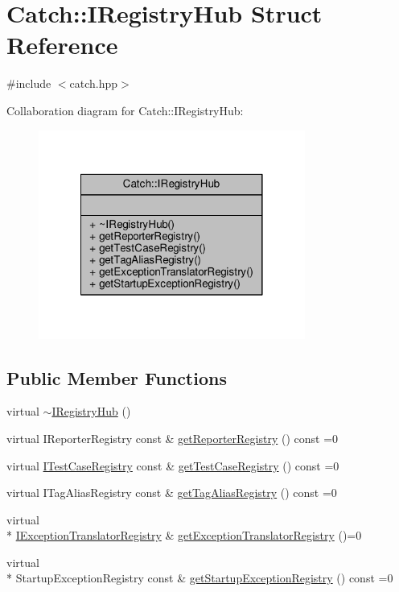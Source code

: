 \hypertarget{struct_catch_1_1_i_registry_hub}{\section{Catch\-:\-:I\-Registry\-Hub Struct Reference}
\label{struct_catch_1_1_i_registry_hub}
}


{\ttfamily \#include $<$catch.\-hpp$>$}



Collaboration diagram for Catch\-:\-:I\-Registry\-Hub\-:
\nopagebreak
\begin{figure}[H]
\begin{center}
\leavevmode
\includegraphics[width=248pt]{struct_catch_1_1_i_registry_hub__coll__graph}
\end{center}
\end{figure}
\subsection*{Public Member Functions}
\begin{DoxyCompactItemize}
\item 
virtual \hyperlink{struct_catch_1_1_i_registry_hub_a050de0f27f96888c8b410992146c9a09}{$\sim$\-I\-Registry\-Hub} ()
\item 
virtual I\-Reporter\-Registry const \& \hyperlink{struct_catch_1_1_i_registry_hub_a55534563f7ecf7e20ec1e37285ebe54d}{get\-Reporter\-Registry} () const =0
\item 
virtual \hyperlink{struct_catch_1_1_i_test_case_registry}{I\-Test\-Case\-Registry} const \& \hyperlink{struct_catch_1_1_i_registry_hub_af4f6255f0c0f8f1f179fa9d7d4843076}{get\-Test\-Case\-Registry} () const =0
\item 
virtual I\-Tag\-Alias\-Registry const \& \hyperlink{struct_catch_1_1_i_registry_hub_a3c511b1d33e5a6d95c333a0ff387df1a}{get\-Tag\-Alias\-Registry} () const =0
\item 
virtual \\*
\hyperlink{struct_catch_1_1_i_exception_translator_registry}{I\-Exception\-Translator\-Registry} \& \hyperlink{struct_catch_1_1_i_registry_hub_a3606988da110c016c5af3ae63454eb78}{get\-Exception\-Translator\-Registry} ()=0
\item 
virtual \\*
Startup\-Exception\-Registry const \& \hyperlink{struct_catch_1_1_i_registry_hub_a00281210628e6c616aca1d3e0d84db04}{get\-Startup\-Exception\-Registry} () const =0
\end{DoxyCompactItemize}


